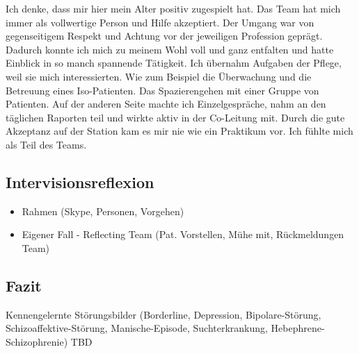 \documentclass[jou,apacite]{apa6}
\begin{document}
Ich denke, dass mir hier mein Alter positiv zugespielt hat. Das Team hat mich immer als vollwertige Person und Hilfe akzeptiert. Der Umgang war von gegenseitigem Respekt und Achtung vor der jeweiligen Profession geprägt. Dadurch konnte ich mich zu meinem Wohl voll und ganz entfalten und hatte Einblick in so manch spannende Tätigkeit. Ich übernahm Aufgaben der Pflege, weil sie mich interessierten. Wie zum Beispiel die Überwachung und die Betreuung eines Iso-Patienten. Das Spazierengehen mit einer Gruppe von Patienten. Auf der anderen Seite machte ich Einzelgespräche, nahm an den täglichen Raporten teil und wirkte aktiv in der Co-Leitung mit. Durch die gute Akzeptanz auf der Station kam es mir nie wie ein Praktikum vor. Ich fühlte mich als Teil des Teams.  

\subsection{Intervisionsreflexion} \label{sec:Intervision}
\begin{itemize}
    \item Rahmen (Skype, Personen, Vorgehen)
    \item Eigener Fall - Reflecting Team (Pat. Vorstellen, Mühe mit, Rückmeldungen Team)
\end{itemize}

\subsection{Fazit}
Kennengelernte Störungsbilder (Borderline, Depression, Bipolare-Störung, Schizoaffektive-Störung, Manische-Episode, Suchterkrankung, Hebephrene-Schizophrenie)
TBD

\begin{flushleft}
\nocite{*}
{}
\end{flushleft}
\end{document}
